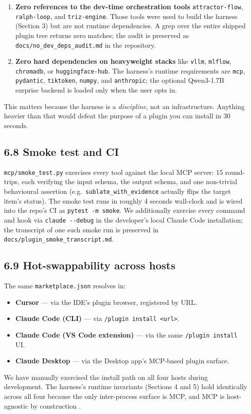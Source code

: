 \begin{enumerate}
\def\labelenumi{\arabic{enumi}.}
\tightlist
\item
  \textbf{Zero references to the dev-time orchestration tools} \texttt{attractor-flow}, \texttt{ralph-loop}, and \texttt{triz-engine}. Those tools were used to build the harness (Section 3) but are not runtime dependencies. A grep over the entire shipped plugin tree returns zero matches; the audit is preserved as \texttt{docs/no\_dev\_deps\_audit.md} in the repository.
\item
  \textbf{Zero hard dependencies on heavyweight stacks} like \texttt{vllm}, \texttt{mlflow}, \texttt{chromadb}, or \texttt{huggingface-hub}. The harness's runtime requirements are \texttt{mcp}, \texttt{pydantic}, \texttt{tiktoken}, \texttt{numpy}, and \texttt{anthropic}; the optional Qwen3-1.7B surprise backend is loaded only when the user opts in.
\end{enumerate}

This matters because the harness is a \emph{discipline}, not an infrastructure. Anything heavier than that would defeat the purpose of a plugin you can install in 30 seconds.

\subsection{6.8 Smoke test and CI}\label{smoke-test-and-ci}

\texttt{mcp/smoke\_test.py} exercises every tool against the local MCP server: 15 round-trips, each verifying the input schema, the output schema, and one non-trivial behavioural assertion (e.g.~\texttt{sublate\_with\_evidence} actually flips the target item's status). The smoke test runs in roughly 4 seconds wall-clock and is wired into the repo's CI as \texttt{pytest\ -m\ smoke}. We additionally exercise every command and hook via \texttt{claude\ -\/-debug} in the developer's local Claude Code installation; the transcript of one such smoke run is preserved in \texttt{docs/plugin\_smoke\_transcript.md}.

\subsection{6.9 Hot-swappability across hosts}\label{hot-swappability-across-hosts}

The same \texttt{marketplace.json} resolves in:

\begin{itemize}
\tightlist
\item
  \textbf{Cursor} --- via the IDE's plugin browser, registered by URL.
\item
  \textbf{Claude Code (CLI)} --- via \texttt{/plugin\ install\ \textless{}url\textgreater{}}.
\item
  \textbf{Claude Code (VS Code extension)} --- via the same \texttt{/plugin\ install} UI.
\item
  \textbf{Claude Desktop} --- via the Desktop app's MCP-based plugin surface.
\end{itemize}

We have manually exercised the install path on all four hosts during development. The harness's runtime invariants (Sections 4 and 5) hold identically across all four because the only inter-process surface is MCP, and MCP is host-agnostic by construction \citep{anthropic2025mcp}.

